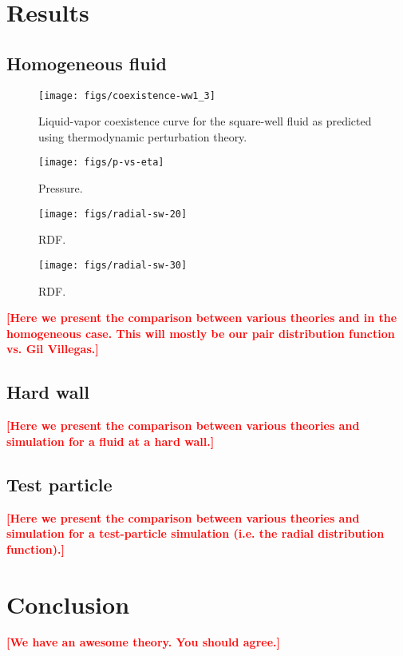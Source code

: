\documentclass[letterpaper,twocolumn,amsmath,amssymb,pre,aps,10pt]{revtex4-1}
\newcommand\fixme[1]{\textcolor{red}{\textbf{[#1]}}}
\begin{document}
\section{Results}

\subsection{Homogeneous fluid}

\begin{figure}
\begin{center}
\texttt{[image: figs/coexistence-ww1\_3]}
\end{center}
\caption{Liquid-vapor coexistence curve for the square-well fluid as
  predicted using thermodynamic perturbation theory.}
\label{fig:coexistencec}
\end{figure}

\begin{figure}
\begin{center}
\texttt{[image: figs/p-vs-eta]}
\end{center}
\caption{Pressure.}
\label{fig:p-vs-eta}
\end{figure}


\begin{figure}[h]
\begin{center}
\texttt{[image: figs/radial-sw-20]}
\end{center}
\caption{RDF.}
\label{fig:homogeneous-20}
\end{figure}

\begin{figure}[h]
\begin{center}
\texttt{[image: figs/radial-sw-30]}
\end{center}
\caption{RDF.}
\label{fig:homogeneous-30}
\end{figure}

\fixme{Here we present the comparison between various theories and in
  the homogeneous case.  This will mostly be our pair distribution
  function vs. Gil Villegas.}

\subsection{Hard wall}

\fixme{Here we present the comparison between various theories and
  simulation for a fluid at a hard wall.}

\subsection{Test particle}

\fixme{Here we present the comparison between various theories and
  simulation for a test-particle simulation (i.e. the radial
  distribution function).}

\section{Conclusion}

\fixme{We have an awesome theory. You should agree.}

\end{document}
